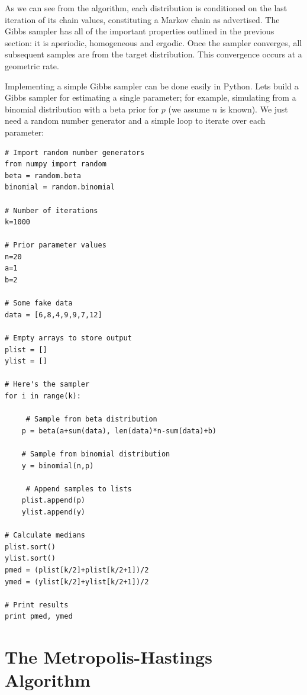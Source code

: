 As we can see from the algorithm, each distribution is conditioned on the last iteration of its chain values, constituting a Markov chain as advertised. The Gibbs sampler has all of the important properties outlined in the previous section: it is aperiodic, homogeneous and ergodic. Once the sampler converges, all subsequent samples are from the target distribution. This convergence occurs at a geometric rate.

Implementing a simple Gibbs sampler can be done easily in Python. Lets build a Gibbs sampler for estimating a single parameter; for example, simulating from a binomial distribution with a beta prior for $p$ (we assume $n$ is known). We just need a random number generator and a simple loop to iterate over each parameter:
\vspace{1cm}
\begin{verbatim}
# Import random number generators
from numpy import random
beta = random.beta
binomial = random.binomial

# Number of iterations
k=1000

# Prior parameter values
n=20
a=1
b=2

# Some fake data
data = [6,8,4,9,9,7,12]

# Empty arrays to store output
plist = []
ylist = []

# Here's the sampler
for i in range(k):

     # Sample from beta distribution
    p = beta(a+sum(data), len(data)*n-sum(data)+b)

    # Sample from binomial distribution
    y = binomial(n,p)

     # Append samples to lists
    plist.append(p)
    ylist.append(y)

# Calculate medians
plist.sort()
ylist.sort()
pmed = (plist[k/2]+plist[k/2+1])/2
ymed = (ylist[k/2]+ylist[k/2+1])/2

# Print results
print pmed, ymed
\end{verbatim}
\vspace{1cm}


\hypertarget{the-metropolis-hastings-algorithm}{}
\section*{The Metropolis-Hastings Algorithm}

